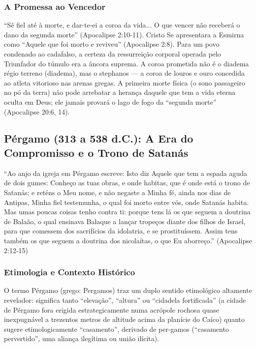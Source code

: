 \documentclass[11pt,a4paper,openany]{book}
\begin{document}
\subsubsection*{A Promessa ao Vencedor}
``Sê fiel até à morte, e dar-te-ei a coroa da vida... O que vencer não receberá o dano da segunda morte'' (Apocalipse 2:10-11). Cristo Se apresentara a Esmirna como ``Aquele que foi morto e reviveu'' (Apocalipse 2:8). Para um povo condenado ao cadafalso, a certeza da ressurreição corporal operada pelo Triunfador do túmulo era a âncora suprema. A coroa prometida não é o diadema régio terreno (diadema), mas o stephanos — a coroa de louros e ouro concedida ao atleta vitorioso nas arenas gregas. A primeira morte física (o sono passageiro no pó da terra) não pode arrebatar a herança daquele que tem a vida eterna oculta em Deus; ele jamais provará o lago de fogo da ``segunda morte'' (Apocalipse 20:6, 14).



\subsection{Pérgamo (313 a 538 d.C.): A Era do Compromisso e o Trono de Satanás}


``Ao anjo da igreja em Pérgamo escreve: Isto diz Aquele que tem a espada aguda de dois gumes: Conheço as tuas obras, e onde habitas, que é onde está o trono de Satanás; e reténs o Meu nome, e não negaste a Minha fé, ainda nos dias de Antipas, Minha fiel testemunha, o qual foi morto entre vós, onde Satanás habita. Mas umas poucas coisas tenho contra ti: porque tens lá os que seguem a doutrina de Balaão, o qual ensinava Balaque a lançar tropeços diante dos filhos de Israel, para que comessem dos sacrifícios da idolatria, e se prostituíssem. Assim tens também os que seguem a doutrina dos nicolaítas, o que Eu aborreço.'' (Apocalipse 2:12-15)


\subsubsection*{Etimologia e Contexto Histórico}
O termo Pérgamo (grego: Pergamos) traz um duplo sentido etimológico altamente revelador: significa tanto ``elevação'', ``altura'' ou ``cidadela fortificada'' (a cidade de Pérgamo fora erigida estrategicamente numa acrópole rochosa quase inexpugnável a trezentos metros de altitude acima da planície do Caíco) quanto sugere etimologicamente ``casamento'', derivado de per-gamos (``casamento pervertido'', uma aliança ilegítima ou união ilícita).
\end{document}
